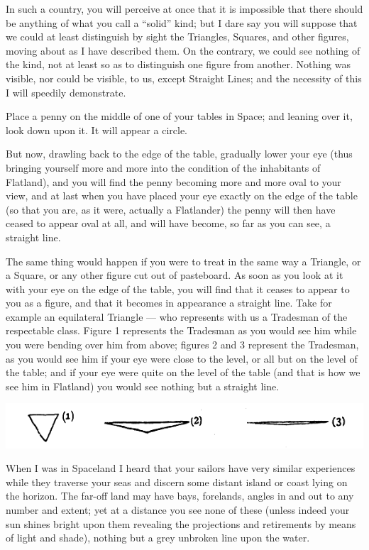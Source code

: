 \documentclass[12pt, a4paper, twoside]{memoir}
\begin{document}
In such a country, you will perceive at once that it is impossible that there
should be anything of what you call a ``solid'' kind; but I dare say you will
suppose that we could at least distinguish by sight the Triangles, Squares,
and other figures, moving about as I have described them. On the contrary, we
could see nothing of the kind, not at least so as to distinguish one figure
from another. Nothing was visible, nor could be visible, to us, except
Straight Lines; and the necessity of this I will speedily demonstrate.

Place a penny on the middle of one of your tables in Space; and leaning over
it, look down upon it. It will appear a circle.

But now, drawling back to the edge of the table, gradually lower your eye
(thus bringing yourself more and more into the condition of the inhabitants of
Flatland), and you will find the penny becoming more and more oval to your
view, and at last when you have placed your eye exactly on the edge of the
table (so that you are, as it were, actually a Flatlander) the penny will then
have ceased to appear oval at all, and will have become, so far as you can
see, a straight line.

The same thing would happen if you were to treat in the same way a Triangle,
or a Square, or any other figure cut out of pasteboard. As soon as you look at
it with your eye on the edge of the table, you will find that it ceases to
appear to you as a figure, and that it becomes in appearance a straight line.
Take for example an equilateral Triangle --- who represents with us a Tradesman
of the respectable class. Figure 1 represents the Tradesman as you would see
him while you were bending over him from above; figures 2 and 3 represent the
Tradesman, as you would see him if your eye were close to the level, or all
but on the level of the table; and if your eye were quite on the level of the
table (and that is how we see him in Flatland) you would see nothing but a
straight line.

\includegraphics[trim=20mm 0mm 0mm 0mm,width=\linewidth]{fig1}

When I was in Spaceland I heard that your sailors have very similar
experiences while they traverse your seas and discern some distant island or
coast lying on the horizon. The far-off land may have bays, forelands, angles
in and out to any number and extent; yet at a distance you see none of these
(unless indeed your sun shines bright upon them revealing the projections and
retirements by means of light and shade), nothing but a grey unbroken line
upon the water.
\end{document}
